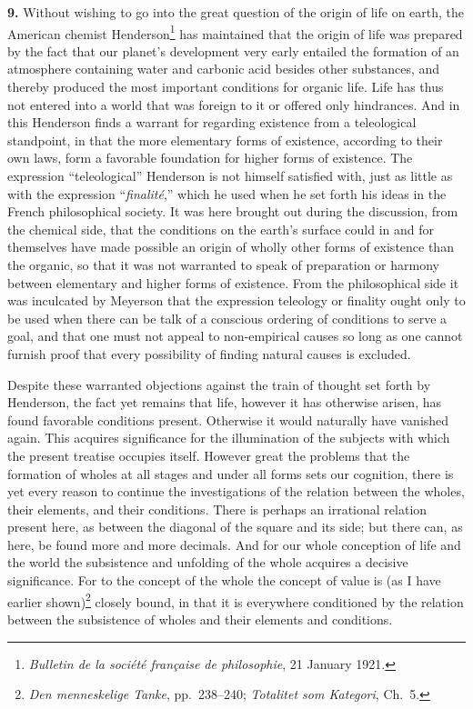 \documentclass[12pt]{book}
\newcommand{\hnum}[1]{\textbf{#1.}\enspace}
\newcommand{\opage}[1]{\marginnote{\footnotesize\textit{[#1]}}}
\begin{document}
\hnum{9} Without wishing to go into the great question of the origin of life on earth, the American
chemist Henderson\footnote{\textit{Bulletin de la société française de philosophie}, 21 January
1921.} has maintained that the origin of life was prepared by the fact that our planet's development
very early entailed the formation of an atmosphere containing water and carbonic acid besides other
substances, and thereby produced the most important \opage{31}conditions for organic life. Life has thus not
entered into a world that was foreign to it or offered only hindrances. And in this Henderson finds a
warrant for regarding existence from a teleological standpoint, in that the more elementary forms of
existence, according to their own laws, form a favorable foundation for higher forms of existence.
The expression ``teleological'' Henderson is not himself satisfied with, just as little as with the
expression ``\textit{finalité},'' which he used when he set forth his ideas in the French
philosophical society. It was here brought out during the discussion, from the chemical side, that the
conditions on the earth's surface could in and for themselves have made possible an origin of wholly
other forms of existence than the organic, so that it was not warranted to speak of preparation or
harmony between elementary and higher forms of existence. From the philosophical side it was
inculcated by Meyerson that the expression teleology or finality ought only to be used when there can
be talk of a conscious ordering of conditions to serve a goal, and that one must not appeal to
non-empirical causes so long as one cannot furnish proof that every possibility of finding natural
causes is excluded.

Despite these warranted objections against the train of thought set forth by Henderson, the fact yet
remains that life, however it has otherwise arisen, has found favorable conditions present. Otherwise
it would naturally have vanished again. This acquires significance for the illumination of the
subjects with which the present treatise occupies itself. However great the problems that the
formation of wholes at all stages and under all forms sets our cognition, there is yet every reason
to continue the investigations of the relation between the wholes, their elements, and their
\opage{32}conditions. There is perhaps an irrational relation present here, as between the diagonal of the
square and its side; but there can, as here, be found more and more decimals. And for our whole
conception of life and the world the subsistence and unfolding of the whole acquires a decisive
significance. For to the concept of the whole the concept of value is (as I have earlier shown)\footnote{\textit{Den
menneskelige Tanke}, pp.\ 238--240; \textit{Totalitet som Kategori}, Ch.\ 5.} closely bound, in that
it is everywhere conditioned by the relation between the subsistence of wholes and their elements and
conditions.
\end{document}
